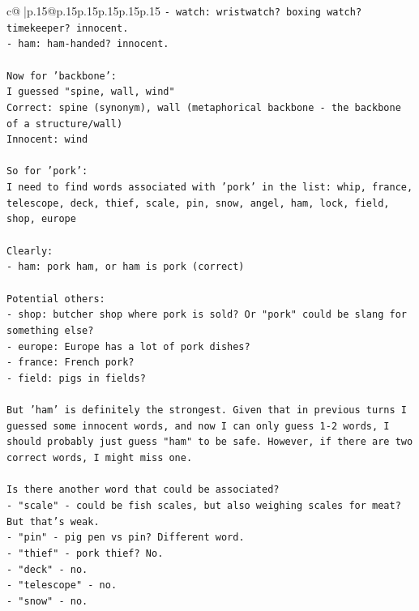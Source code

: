 \documentclass{article}
\begin{document}
{\begin{supertabular}{c@{$\;$}|p{.15\linewidth}@{}p{.15\linewidth}p{.15\linewidth}p{.15\linewidth}p{.15\linewidth}p{.15\linewidth}}
{{{\texttt{{-} watch: wristwatch? boxing watch? timekeeper? innocent.} \\
\texttt{{-} ham: ham{-}handed? innocent.} \\
\\ 
\texttt{Now for 'backbone':} \\
\texttt{I guessed "spine, wall, wind"} \\
\texttt{Correct: spine (synonym), wall (metaphorical backbone {-} the backbone of a structure/wall)} \\
\texttt{Innocent: wind} \\
\\ 
\texttt{So for 'pork':} \\
\texttt{I need to find words associated with 'pork' in the list: whip, france, telescope, deck, thief, scale, pin, snow, angel, ham, lock, field, shop, europe} \\
\\ 
\texttt{Clearly:} \\
\texttt{{-} ham: pork ham, or ham is pork (correct)} \\
\\ 
\texttt{Potential others:} \\
\texttt{{-} shop: butcher shop where pork is sold? Or "pork" could be slang for something else?} \\
\texttt{{-} europe: Europe has a lot of pork dishes?} \\
\texttt{{-} france: French pork?} \\
\texttt{{-} field: pigs in fields?} \\
\\ 
\texttt{But 'ham' is definitely the strongest. Given that in previous turns I guessed some innocent words, and now I can only guess 1{-}2 words, I should probably just guess "ham" to be safe. However, if there are two correct words, I might miss one.} \\
\\ 
\texttt{Is there another word that could be associated?} \\
\texttt{{-} "scale" {-} could be fish scales, but also weighing scales for meat? But that's weak.} \\
\texttt{{-} "pin" {-} pig pen vs pin? Different word.} \\
\texttt{{-} "thief" {-} pork thief? No.} \\
\texttt{{-} "deck" {-} no.} \\
\texttt{{-} "telescope" {-} no.} \\
\texttt{{-} "snow" {-} no.} \\
}}}
\end{supertabular}}
\end{document}
